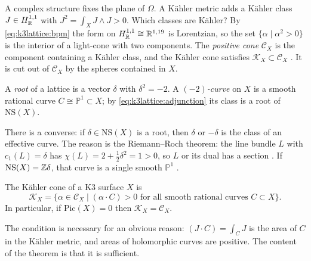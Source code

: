 A complex structure fixes the plane of $\Omega$. A Kähler metric adds a Kähler class
$J\in H^{1,1}_{\mathbb{R}}$ with $J^2=\int_XJ\wedge J>0$. Which classes are Kähler? By
\eqref{eq:k3lattice:bpm} the form on $H^{1,1}_{\mathbb{R}}\cong\mathbb{R}^{1,19}$ is Lorentzian, so the set
$\{\alpha\mid\alpha^2>0\}$ is the interior of a light-cone with two components. The
\emph{positive cone} $\mathcal C_X$ is the component containing a Kähler
class, and the Kähler cone satisfies $\mathcal K_X\subset\mathcal C_X$
. It is cut out of $\mathcal C_X$ by the spheres
contained in $X$.

\begin{definition}[Roots]\label{def:k3lattice:roots}
A \emph{root} of a lattice is a vector $\delta$ with $\delta^2=-2$. A
\emph{$(-2)$-curve} on $X$ is a smooth rational curve $C\cong\mathbb P^1\subset X$; by
\eqref{eq:k3lattice:adjunction} its class is a root of $\mathrm{NS}(X)$.
\end{definition}
There is a converse: if $\delta\in\mathrm{NS}(X)$ is a root, then $\delta$ or $-\delta$ is
the class of an effective curve. The reason is the Riemann--Roch theorem: the line bundle $L$
with $c_1(L)=\delta$ has $\chi(L)=2+\tfrac12\delta^2=1>0$, so $L$ or its dual has a section
. If $\mathrm{NS}(X)=\mathbb{Z}\delta$,
that curve is a single smooth $\mathbb P^1$ .

\begin{theorem}\label{thm:k3lattice:kahler}
The Kähler cone of a K3 surface $X$ is
\begin{equation}\label{eq:k3lattice:kahler}
 \mathcal K_X=\{\alpha\in\mathcal C_X\mid(\alpha\cdot C)>0\text{ for all smooth rational
 curves }C\subset X\} .
\end{equation}
In particular, if $\mathrm{Pic}(X)=0$ then $\mathcal K_X=\mathcal C_X$. \TL{}
\end{theorem}
The condition is necessary for an obvious reason: $(J\cdot C)=\int_CJ$ is the area of $C$ in
the Kähler metric, and areas of holomorphic curves are positive. The content of the theorem
is that it is sufficient.

